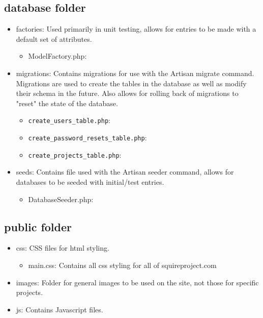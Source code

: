 \subsection{database folder}
\begin{itemize}
    \item factories: Used primarily in unit testing, allows for entries to be made with a default set of attributes.
    \begin{itemize}
        \item ModelFactory.php:
    \end{itemize}
    \item migrations: Contains migrations for use with the Artisan migrate command. Migrations are used to create the tables in the database as well as modify their schema in the future. Also allows for rolling back of migrations to "reset" the state of the database.
    \begin{itemize}
        \item \texttt{create\_users\_table.php}:
        \item \texttt{create\_password\_resets\_table.php}:
        \item \texttt{create\_projects\_table.php}: 
    \end{itemize}
    \item seeds: Contains file used with the Artisan seeder command, allows for databases to be seeded with initial/test entries.
    \begin{itemize}
        \item DatabaseSeeder.php:
    \end{itemize}
\end{itemize}


\subsection{public folder}
\begin{itemize}
    \item css: CSS files for html styling.
    \begin{itemize}
        \item main.css: Contains all css styling for all of squireproject.com
    \end{itemize}
    \item images: Folder for general images to be used on the site, not those for specific projects.
    \item js: Contains Javascript files.
\end{itemize}

